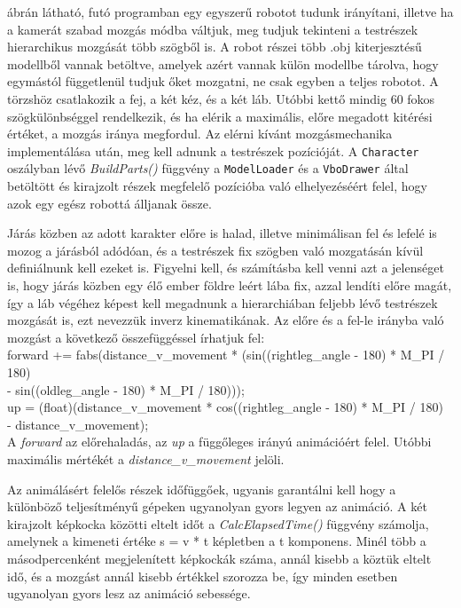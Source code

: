  ábrán látható, futó programban egy egyszerű robotot tudunk irányítani, illetve ha a kamerát szabad mozgás módba váltjuk, meg tudjuk tekinteni a testrészek hierarchikus mozgását több szögből is. A robot részei több .obj kiterjesztésű modellből vannak betöltve, amelyek azért vannak külön modellbe tárolva, hogy egymástól függetlenül tudjuk őket mozgatni, ne csak egyben a teljes robotot. A törzshöz csatlakozik a fej, a két kéz, és a két láb. Utóbbi kettő mindig 60 fokos szögkülönbséggel rendelkezik, és ha elérik a maximális, előre megadott kitérési értéket, a mozgás iránya megfordul. Az elérni kívánt mozgásmechanika implementálása után, meg kell adnunk a testrészek pozícióját. A \texttt{Character} oszályban lévő \textsl{BuildParts()} függvény a \texttt{ModelLoader} és a \texttt{VboDrawer} által betöltött és kirajzolt részek megfelelő pozícióba való elhelyezéséért felel, hogy azok egy egész robottá álljanak össze.

Járás közben az adott karakter előre is halad, illetve minimálisan fel és lefelé is mozog a járásból adódóan, és a testrészek fix szögben való mozgatásán kívül definiálnunk kell ezeket is. Figyelni kell, és számításba kell venni azt a jelenséget is, hogy járás közben egy élő ember  földre leért lába fix, azzal lendíti előre magát, így a láb végéhez képest kell megadnunk a hierarchiában feljebb lévő testrészek mozgását is, ezt nevezzük inverz kinematikának. Az előre és a fel-le irányba való mozgást a következő összefüggéssel írhatjuk fel:\\

forward += fabs(distance\_v\_movement * (sin((rightleg\_angle - 180) * M\_PI / 180)\\ - sin((oldleg\_angle - 180) * M\_PI / 180)));\\
up = (float)(distance\_v\_movement * cos((rightleg\_angle - 180) * M\_PI / 180)\\ - distance\_v\_movement);\\

A \textsl{forward} az előrehaladás, az \textsl{up} a függőleges irányú animációért felel. Utóbbi maximális mértékét a \textsl{distance\_v\_movement} jelöli.

Az animálásért felelős részek időfüggőek, ugyanis garantálni kell hogy a különböző teljesítményű gépeken ugyanolyan gyors legyen az animáció. A két kirajzolt képkocka közötti eltelt időt a \textsl{CalcElapsedTime()} függvény számolja, amelynek a kimeneti értéke s = v * t képletben a t komponens. Minél több a másodpercenként megjelenített képkockák száma, annál kisebb a köztük eltelt idő, és a mozgást annál kisebb értékkel szorozza be, így minden esetben ugyanolyan gyors lesz az animáció sebessége.

